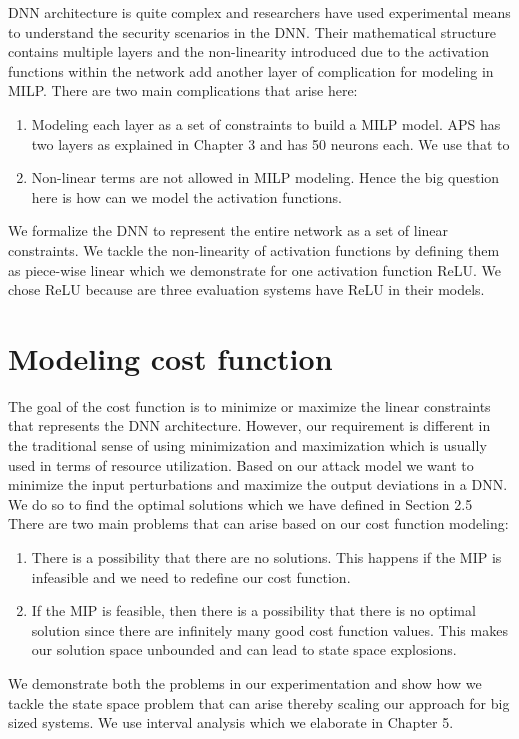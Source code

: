 DNN architecture is quite complex and researchers have used experimental means to understand the security scenarios in the DNN. 
Their  mathematical structure contains multiple layers and the non-linearity introduced due to the activation functions within the network add another layer of complication for modeling in \ac{MILP}.
There are two main complications that arise here:
\begin{enumerate}
	\item Modeling each layer as a set of constraints to build a \ac{MILP} model.
	\ac{APS} has two layers as explained in Chapter 3 and has 50 neurons each. 
	We use that to 
	\item Non-linear terms are not allowed in \ac{MILP} modeling. Hence the big question here is how can we model the activation functions. 
\end{enumerate}

We formalize the \ac{DNN} to represent the entire network as a set of linear constraints. 
We tackle the non-linearity of activation functions by defining them as piece-wise linear which we demonstrate for one activation function ReLU.
We chose ReLU because are three evaluation systems have ReLU in their models. 

\section{Modeling cost function}
The goal of the cost function is to minimize or maximize the linear constraints that represents the \ac{DNN} architecture. 
However, our requirement is different in the traditional sense of using minimization and maximization which is usually used in terms of resource utilization. 
Based on our attack model we want to minimize the input perturbations and maximize the output deviations in a \ac{DNN}.
We do so to find the optimal solutions which we have defined in Section 2.5
There are two main problems that can arise based on our cost function modeling:
\begin{enumerate}
	\item There is a possibility that there are no solutions. 
	This happens if the \ac{MIP} is infeasible and we need to redefine our cost function. 
	\item If the \ac{MIP} is feasible, then there is a possibility that there is no optimal solution since there are infinitely many good cost function values. 
	This makes our solution space unbounded and can lead to state space explosions. 
\end{enumerate}

We demonstrate both the problems in our experimentation and show how we tackle the state space problem that can arise thereby scaling our approach for big sized systems. 
We use interval analysis which we elaborate in Chapter 5.


















